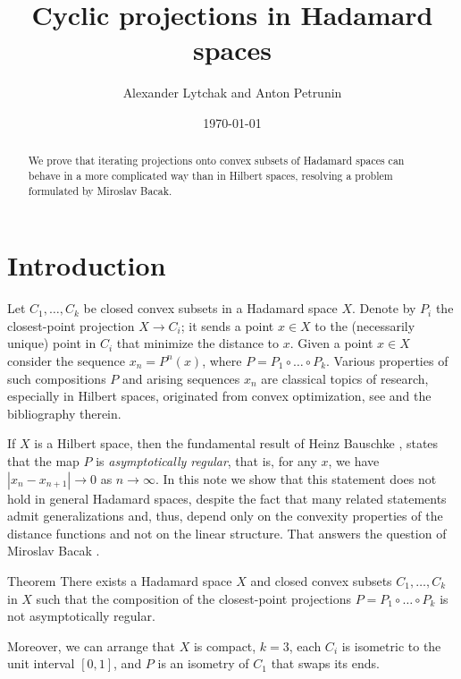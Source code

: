 \documentclass[a4paper,10pt]{article}
\def\thetitle{Cyclic projections in Hadamard spaces}
\def\theauthors{Alexander Lytchak and Anton Petrunin}
\begin{document}
\title{\thetitle}	
\author{\theauthors}
\date{\today}
\maketitle

\begin{abstract}
	We  prove that iterating projections onto convex subsets of Hadamard spaces can behave in a more complicated way than in Hilbert spaces, resolving a problem formulated by Miroslav Bacak. 	
\end{abstract}


\section{Introduction}


Let  $C_1,\dots, C_k$ be closed convex subsets in a Hadamard space $X$.
Denote by $P_i$ the closest-point projection $X\to C_i$; it sends a point $x\in X$ to the (necessarily unique) point in $C_i$ that minimize the distance to $x$.
Given a point $x\in X$ consider the sequence $x_n=P^n(x)$, where
$P= P_1\circ \dots \circ P_k$.
Various properties of such compositions  $P$ and arising  sequences $x_n$
are classical topics of research, especially in Hilbert spaces, originated from convex optimization, see \cite{Bac, Bac2, Bauschke}
and the bibliography therein.

If $X$ is a Hilbert space, then the fundamental result of Heinz Bauschke \cite{Bauschke,Kohlenbach}, states that the map $P$ is \emph{asymptotically regular}, that is, for any $x$, we have  $|x_n-x_{n+1}|\to 0$ as $n\to \infty$.
In this note we show that this statement does not hold in general Hadamard spaces, despite the fact that many related statements
admit generalizations and, thus, depend only on the convexity properties of the distance functions and not on the linear structure. 
That answers the question of Miroslav Bacak \cite[Problem 6.13]{Bac}.

\begin{thm}{Theorem}\label{thm}
There exists a Hadamard space $X$ and closed convex subsets $C_1,\dots,C_k$ in $X$ such that the composition of the closest-point projections $P= P_1\circ \dots \circ P_k$ is not asymptotically regular.

Moreover, we can arrange that $X$ is compact, $k=3$, each $C_i$ is isometric to the unit interval $[0,1]$, 
and $P$ is an isometry of $C_1$ that swaps its ends.
\end{thm}
\end{document}
